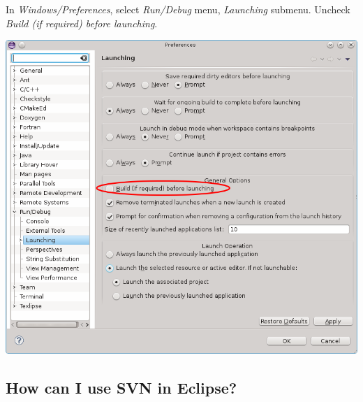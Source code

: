 \documentclass[a4paper]{article}
\begin{document}
In \emph{Windows/Preferences}, select \emph{Run/Debug} menu, \emph{Launching} submenu. Uncheck \emph{Build (if required) before launching}.
\begin{center}
\noindent
\includegraphics[scale=0.4]{eclipse/09-eclipseJUNO-launchConfig.png}
\end{center}

\subsection{How can I use SVN in Eclipse?}
\end{document}
